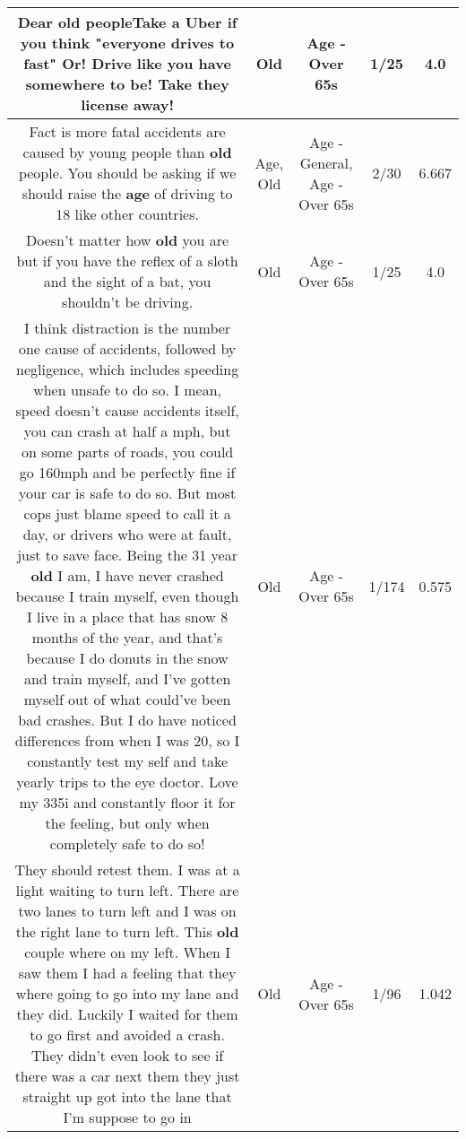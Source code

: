 \documentclass[11pt]{article}
\newlength\mylength
\begin{document}
\begin{center}
\begin{longtable}{|C{.65\mylength}|C{.30\mylength}|C{.12\mylength}|C{.12\mylength}|C{.12\mylength}|}
  \small Dear \textbf{old} peopleTake a Uber if you think "everyone drives to fast" Or! Drive like you have somewhere to be! Take they license away!\normalsize   & Old & Age - Over 65s & 1/25 & 4.0 \\  \hline
  \small Fact is more fatal accidents are caused by young people than \textbf{old} people.  You should be asking if we should raise the \textbf{age} of driving to 18 like other countries.\normalsize   & Age, Old & Age - General, Age - Over 65s & 2/30 & 6.667 \\  \hline
  \small Doesn't matter how \textbf{old} you are but if you have the reflex of a sloth and the sight of a bat, you shouldn't be driving.\normalsize   & Old & Age - Over 65s & 1/25 & 4.0 \\  \hline
  \small I think distraction is the number one cause of accidents, followed by negligence, which includes speeding when unsafe to do so. I mean, speed doesn't cause accidents itself, you can crash at half a mph, but on some parts of roads, you could go 160mph and be perfectly fine if your car is safe to do so. But most cops just blame speed to call it a day, or drivers who were at fault, just to save face. Being the 31 year \textbf{old} I am, I have never crashed because I train myself, even though I live in a place that has snow 8 months of the year, and that's because I do donuts in the snow and train myself, and I've gotten myself out of what could've been bad crashes. But I do have noticed differences from when I was 20, so I constantly test my self and take yearly trips to the eye doctor. Love my 335i and constantly floor it for the feeling, but only when completely safe to do so!\normalsize   & Old & Age - Over 65s & 1/174 & 0.575 \\  \hline
  \small They should retest them. I was at a light waiting to turn left. There are two lanes to turn left and I was on the right lane to turn left. This \textbf{old} couple where on my left. When I saw them I had a feeling that they where going to go into my lane and they did. Luckily I waited for them to go first and avoided a crash. They didn't even look to see if there was a car next them they just straight up got into the lane that I'm suppose to go in\normalsize   & Old & Age - Over 65s & 1/96 & 1.042 \\  \hline

\end{longtable}
\end{center}
\end{document}
